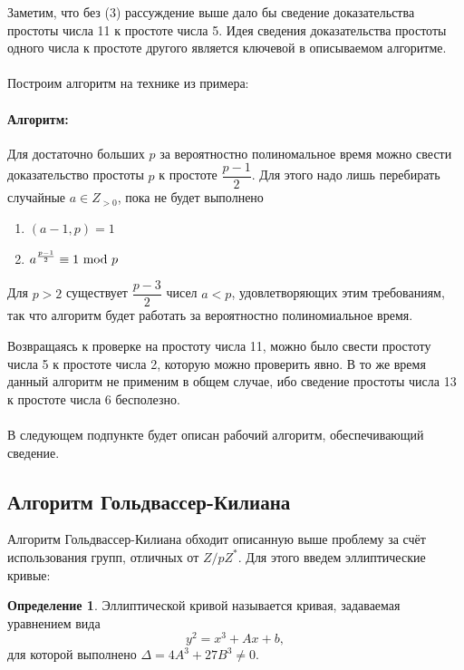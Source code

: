\documentclass[12pt]{article}
\theoremstyle{definition}
\newtheorem{Def}{Определение}
\numberwithin{Def}{section}
\numberwithin{Th}{section}
\numberwithin{St}{section}
\numberwithin{Cor}{section}
\begin{document}
Заметим, что без (3) рассуждение выше дало бы сведение доказательства простоты
числа 11 к простоте числа 5. Идея сведения доказательства простоты одного числа
к простоте другого является ключевой в описываемом алгоритме.

\paragraph{}Построим алгоритм на технике из примера:

\paragraph{Алгоритм:} Для достаточно больших $p$ за
вероятностно полиномальное время можно свести
доказательство простоты $p$ к простоте $\dfrac{p-1}2$. Для этого надо лишь
перебирать случайные $a\in Z_{>0}$, пока не будет выполнено
\begin{enumerate}[(1)]
	\item $(a-1,p)=1$
	\item $a^{\frac{p-1}2}\equiv1\ \mathrm{mod}\ p$
\end{enumerate}

Для $p>2$ существует $\dfrac{p-3}2$ чисел $a<p$, удовлетворяющих этим
требованиям, так что алгоритм будет работать за вероятностно полиномиальное
время.

Возвращаясь к проверке на простоту числа 11, можно было свести простоту числа 5
к простоте числа 2, которую можно проверить явно. В то же время данный алгоритм
не применим в общем случае, ибо сведение простоты числа 13 к простоте числа 6
бесполезно.

\paragraph{} В следующем подпункте будет описан рабочий алгоритм, обеспечивающий
сведение.

\subsection{Алгоритм Гольдвассер-Килиана}

Алгоритм Гольдвассер-Килиана обходит описанную выше проблему за счёт
использования групп, отличных от $Z/pZ^*$. Для этого введем эллиптические кривые:

\begin{Def}
Эллиптической кривой называется кривая, задаваемая уравнением вида
$$
y^2=x^3+Ax+b,
$$
для которой выполнено $\Delta=4A^3+27B^3\neq 0$.
\end{Def}
\end{document}
